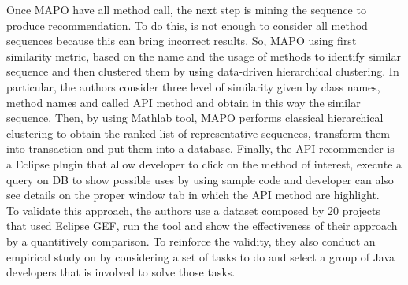 Once MAPO have all method call, the next step is mining the sequence to produce recommendation. To do this, is not enough to consider all method sequences because this can bring incorrect results. So, MAPO using first similarity metric, based on the name and the usage of methods to identify similar sequence and then clustered them by using data-driven hierarchical clustering. In particular, the authors consider three level of similarity given by class names, method names and called API method and obtain in this way the similar sequence. Then, by using Mathlab tool, MAPO performs classical hierarchical clustering to obtain the ranked list of representative sequences, transform them into transaction and put them into a database. Finally, the API recommender is a Eclipse plugin that allow developer to click on the method of interest, execute a query on DB to show possible uses by using sample code and developer can also see details on the proper window tab in which the API method are highlight.\\
 To validate this approach, the authors use a dataset composed by 20 projects that used Eclipse GEF, run the tool and show the effectiveness of their approach by a quantitively comparison. To reinforce the validity, they also conduct an empirical study on by considering a set of tasks to do and select a group of Java developers that is involved to solve those tasks.


